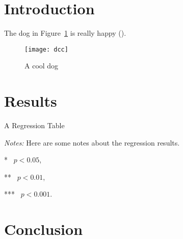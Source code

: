 \section{Introduction}

	\lipsum[2-5]

	The dog in Figure~\ref{fig:dog} is really happy (\cite{Altmejd2017_pre_analysis}).

	\begin{figure}[htbp]\centering
		\caption{A cool dog\label{fig:dog}}
		\texttt{[image: dcc]}
	\end{figure}

\section{Results}

	\lipsum[6-10]

	\begin{table}[htbp]\centering
		\caption{A Regression Table\label{tab:results}}
		\begin{threeparttable}
			{}
			\begin{tablenotes}\footnotesize%
				\item \emph{Notes:} Here are some notes about the regression results.
			\end{tablenotes}
			\begin{tablenotes}\footnotesize%
				\item[*]~\(p < 0.05\),
				\item[**]~\(p < 0.01\),
				\item[***]~\(p < 0.001\).
			\end{tablenotes}
		\end{threeparttable}%
	\end{table}

	\lipsum[1]

\section{Conclusion}

	\lipsum[1-5]

